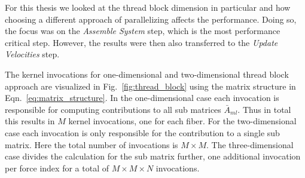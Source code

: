For this thesis we looked at the thread block dimension in particular and how choosing a different approach of parallelizing affects the performance. Doing so, the focus was on the \emph{Assemble System} step, which is the most performance critical step. However, the results were then also transferred to the \emph{Update Velocities} step.

The kernel invocations for one-dimensional and two-dimensional thread block approach are visualized in Fig.~\ref{fig:thread_block} using the matrix structure in Eqn.~\eqref{eq:matrix_structure}. In the one-dimensional case each invocation is responsible for computing contributions to all sub matrices $\bar{A}_{ml}$. Thus in total this results in $M$ kernel invocations, one for each fiber. For the two-dimensional case each invocation is only responsible for the contribution to a single sub matrix. Here the total number of invocations is $M \times M$. The three-dimensional case divides the calculation for the sub matrix further, one additional invocation per force index for a total of $M \times M \times N$ invocations.

